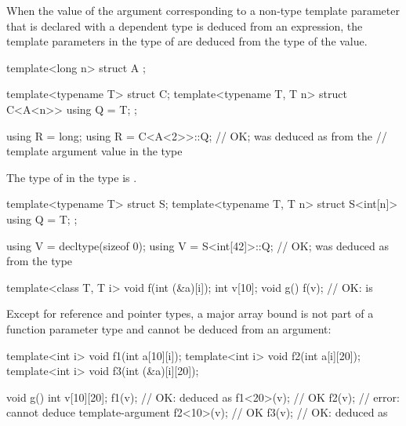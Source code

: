 \pnum
When the value of the argument
corresponding to a non-type template parameter 
that is declared with a dependent type
is deduced from an expression,
the template parameters in the type of 
are deduced from the type of the value.
\begin{example}
\begin{codeblock}
template<long n> struct A { };

template<typename T> struct C;
template<typename T, T n> struct C<A<n>> {
  using Q = T;
};

using R = long;
using R = C<A<2>>::Q;           // OK;  was deduced as  from the
                                // template argument value in the type 
\end{codeblock}
\end{example}

\pnum
The type of  in the type  is .
\begin{example}
\begin{codeblock}
template<typename T> struct S;
template<typename T, T n> struct S<int[n]> {
  using Q = T;
};

using V = decltype(sizeof 0);
using V = S<int[42]>::Q;        // OK;  was deduced as  from the type 
\end{codeblock}
\end{example}

\pnum
\begin{example}
\begin{codeblock}
template<class T, T i> void f(int (&a)[i]);
int v[10];
void g() {
  f(v);                         // OK:  is 
}
\end{codeblock}
\end{example}

\pnum
\begin{note}
Except for reference and pointer types, a major array bound is not part of a
function parameter type and cannot be deduced from an argument:
\begin{codeblock}
template<int i> void f1(int a[10][i]);
template<int i> void f2(int a[i][20]);
template<int i> void f3(int (&a)[i][20]);

void g() {
  int v[10][20];
  f1(v);                        // OK:  deduced as 
  f1<20>(v);                    // OK
  f2(v);                        // error: cannot deduce template-argument 
  f2<10>(v);                    // OK
  f3(v);                        // OK:  deduced as 
}
\end{codeblock}
\end{note}

